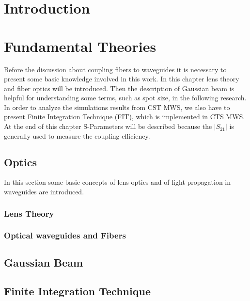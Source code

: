 
\chapter{Introduction}



\chapter{Fundamental Theories}
\label{chp:background}
Before the discussion about coupling fibers to waveguides it is necessary to present some basic knowledge involved in this work.  In this chapter lens theory and fiber optics will be introduced. Then the description of Gaussian beam is helpful for understanding some terms, such as spot size, in the following research.  
In order to analyze the simulations results from CST MWS, we also have to present Finite Integration Technique (FIT), which is implemented in CTS MWS. At the end of this chapter S-Parameters will be described because the $|S_{21}|$ is generally used to measure the coupling efficiency.
 
\section{Optics}
\label{sect:background_optics}
In this section some basic concepts of lens optics and of light propagation in waveguides are introduced.
\subsection{Lens Theory}

\subsection{Optical waveguides and Fibers}


\section{Gaussian Beam}
\label{sect:gaussian_beam}


\section{Finite Integration Technique}
\label{sect:FIT}



